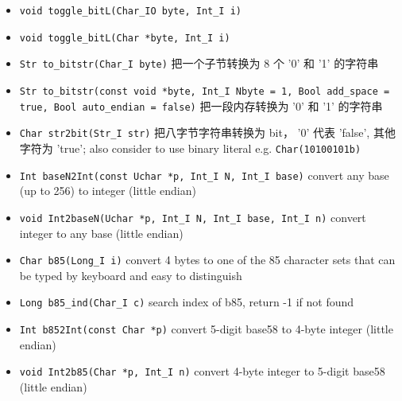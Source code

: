 \begin{itemize}
\item \verb|void toggle_bitL(Char_IO byte, Int_I i)|
\item \verb|void toggle_bitL(Char *byte, Int_I i)|
\item \verb|Str to_bitstr(Char_I byte)| 把一个子节转换为 8 个 '0' 和 '1' 的字符串
\item \verb|Str to_bitstr(const void *byte, Int_I Nbyte = 1, Bool add_space = true, Bool auto_endian = false)| 把一段内存转换为 '0' 和 '1' 的字符串
\item \verb|Char str2bit(Str_I str)| 把八字节字符串转换为 bit， '0' 代表 'false', 其他字符为 'true'; also consider to use binary literal e.g. \verb`Char(10100101b)`
\item \verb|Int baseN2Int(const Uchar *p, Int_I N, Int_I base)| convert any base (up to 256) to integer (little endian)
\item \verb|void Int2baseN(Uchar *p, Int_I N, Int_I base, Int_I n)| convert integer to any base (little endian)
\item \verb|Char b85(Long_I i)| convert 4 bytes to one of the 85 character sets that can be typed by keyboard and easy to distinguish
\item \verb|Long b85_ind(Char_I c)| search index of b85, return -1 if not found
\item \verb|Int b852Int(const Char *p)| convert 5-digit base58 to 4-byte integer (little endian)
\item \verb|void Int2b85(Char *p, Int_I n)| convert 4-byte integer to 5-digit base58 (little endian)
\end{itemize}
